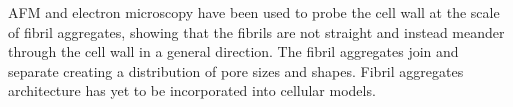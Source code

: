AFM and electron microscopy have been used to probe the cell wall at the scale of fibril aggregates, showing that the fibrils are not straight and instead meander through the cell wall in a general direction. The fibril aggregates join and separate creating a distribution of pore sizes and shapes. Fibril aggregates architecture has yet to be incorporated into cellular models. 